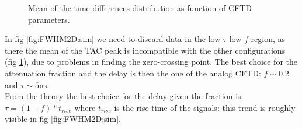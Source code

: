 \documentclass[11pt,a4 paper]{article}
\begin{document}
\begin{figure}[H]
    \centering
    \caption{Mean of the time differences distribution as function of CFTD parameters.}
    \label{fig:Mean2D:sim}
\end{figure}


In fig \ref{fig:FWHM2D:sim} we need to discard data in the low-$\tau$ low-$f$ region, as there the mean of the TAC peak is incompatible with the other configurations (fig \ref{fig:Mean2D:sim}), due to problems in finding the zero-crossing point. The best choice for the attenuation fraction and the delay is then the one of the analog CFTD: $f \sim 0.2$ and $\tau \sim 5\si{\nano\second}$.\\
From the theory the best choice for the delay given the fraction is $\tau = (1 - f)*t_{rise}$ where $t_{rise}$ is the rise time of the signals: this trend is roughly visible in fig \ref{fig:FWHM2D:sim}.

%
\end{document}
